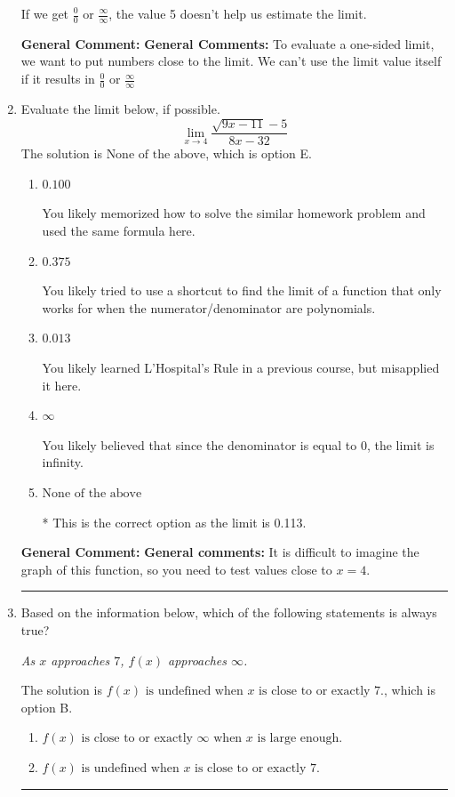 \documentclass{extbook}[14pt]
\newcommand{\litem}[1]{\item #1

\rule{\textwidth}{0.4pt}}
\begin{document}
\begin{enumerate}
{\begin{enumerate}[label=\Alph*.]
If we get $\frac{0}{0}$ or $\frac{\infty}{\infty}$, the value 5 doesn't help us estimate the limit.
\end{enumerate}

\textbf{General Comment:} \textbf{General Comments:} To evaluate a one-sided limit, we want to put numbers close to the limit. We can't use the limit value itself if it results in $\frac{0}{0}$ or $\frac{\infty}{\infty}$
}
\litem{
Evaluate the limit below, if possible.
\[ \lim_{x \rightarrow 4} \frac{\sqrt{9x - 11} - 5}{8x - 32} \]The solution is \( \text{None of the above} \), which is option E.\begin{enumerate}[label=\Alph*.]
\item \( 0.100 \)

You likely memorized how to solve the similar homework problem and used the same formula here.
\item \( 0.375 \)

You likely tried to use a shortcut to find the limit of a function that only works for when the numerator/denominator are polynomials.
\item \( 0.013 \)

You likely learned L'Hospital's Rule in a previous course, but misapplied it here.
\item \( \infty \)

You likely believed that since the denominator is equal to 0, the limit is infinity.
\item \( \text{None of the above} \)

* This is the correct option as the limit is 0.113.
\end{enumerate}

\textbf{General Comment:} \textbf{General comments:} It is difficult to imagine the graph of this function, so you need to test values close to $x = 4$.
}
\litem{
Based on the information below, which of the following statements is always true?

\begin{center}
    \textit{ As $x$ approaches $7$, $f(x)$ approaches $\infty$. }
\end{center}
The solution is \( f(x) \text{ is undefined when } x \text{ is close to or exactly } 7. \), which is option B.\begin{enumerate}[label=\Alph*.]
\item \( f(x) \text{ is close to or exactly } \infty \text{ when } x \text{ is large enough}. \)


\item \( f(x) \text{ is undefined when } x \text{ is close to or exactly } 7. \)



\end{enumerate}}
\end{enumerate}
\end{document}
